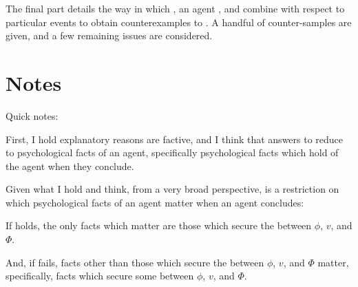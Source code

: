 \begin{note}
\begin{TOCEnum}
    The final part details the way in which , an agent , and \requ{} combine with respect to particular events to obtain counterexamples to \issueInclusion{}.
    A handful of counter-samples are given, and a few remaining issues are considered.
  \end{TOCEnum}
\end{note}

\section*{Notes}

\begin{note}
  Quick notes:

  First, I hold explanatory reasons are factive, and I think that answers to \qWhy{} reduce to psychological facts of an agent, specifically psychological facts which hold of the agent when they conclude.%


  Given what I hold and think, from a very broad perspective, \issueInclusion{} is a restriction on which psychological facts of an agent matter when an agent concludes:

  If \issueInclusion{} holds, the only facts which matter are those which secure the \ros{} between \(\phi\), \(v\), and \(\Phi\).

  And, if \issueInclusion{} fails, facts other than those which secure the \ros{} between \(\phi\), \(v\), and \(\Phi\) matter, specifically, facts which secure some \ros{} between \(\phi\), \(v\), and \(\Phi\).
\end{note}


